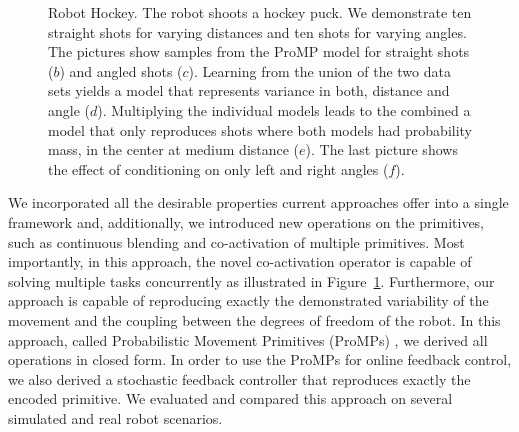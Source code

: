 \documentclass[final,5p,twocolumn]{elsarticle}
\begin{document}
\begin{figure}
\centering
{}

\vspace{0.2em}


\caption{Robot Hockey. The robot shoots a hockey puck. We demonstrate ten straight
shots for varying distances and ten shots for varying angles. The
pictures show samples from the ProMP model for straight shots ($b$)
and angled shots ($c$). Learning from the union of the two data sets yields a model
that represents variance in both, distance and angle ($d$). Multiplying
the individual models leads to the combined a model that only reproduces shots
where both models had probability mass, in the center at medium distance
($e$). The last picture shows the effect of conditioning on only left
and right angles ($f$).}
\label{fig:Robot-Hockey}

\end{figure}

We incorporated all the desirable properties 
current approaches offer into a single framework and, additionally, we 
introduced new operations on the primitives, such as continuous blending and
co-activation of multiple primitives.  Most importantly, in this approach, the
novel co-activation operator is capable of solving multiple tasks concurrently as illustrated in Figure~\ref{fig:Robot-Hockey}.
Furthermore, our approach is capable of reproducing exactly the demonstrated
variability of the movement and the coupling between the degrees of freedom of
the robot.  In this approach, called Probabilistic Movement Primitives (ProMPs) \cite{Paraschos2013,Paraschos2013a},
we derived all operations in closed form. In order to use the ProMPs for online
feedback control, we also derived a stochastic feedback controller that
reproduces exactly the encoded primitive. We evaluated and compared this approach
on several simulated and real robot scenarios.
\end{document}
